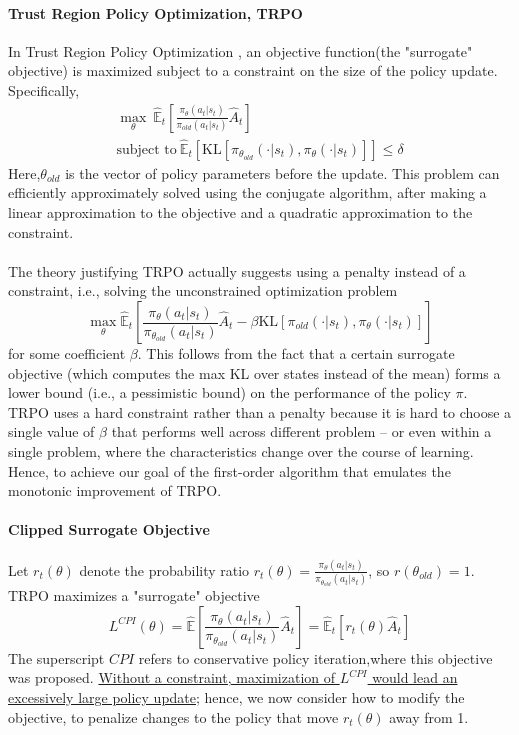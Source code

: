 \paragraph{Trust Region Policy Optimization, TRPO} In Trust Region Policy Optimization \cite{Schulman2015Trust, Wu2017Scalable}, an objective function(the "surrogate" objective) is maximized subject to a constraint on the size of the policy update. Specifically,
\begin{equation}
\begin{aligned}
\max_{\theta} \ \hat{\mathbb{E}}_{t}\left[\frac{\pi_{\theta}(a_{t}|s_{t})}{\pi_{old}(a_{t}|s_{t})}\hat{A}_{t}\right]\\
\text{subject to} \ \hat{\mathbb{E}}_{t}[\text{KL}[\pi_{\theta_{old}}(\cdot|s_{t}), \pi_{\theta}(\cdot|s_{t})]] \leq \delta
\end{aligned}
\end{equation}
Here,$\theta_{old}$ is the vector of policy parameters before the update. This problem can efficiently approximately solved using the conjugate algorithm, after making a linear approximation to the objective and a quadratic approximation to the constraint.
\paragraph{}The theory justifying TRPO actually suggests using a penalty instead of a constraint, i.e., solving the unconstrained optimization problem
\begin{equation}
\max_{\theta}\hat{\mathbb{E}}_{t}\left[\frac{\pi_{\theta}(a_{t}|s_{t})}{\pi_{\theta_{old}}(a_{t}|s_{t})}\hat{A}_{t} - \beta \text{KL}[\pi_{old}(\cdot|s_{t}), \pi_{\theta}(\cdot|s_{t})] \right]
\end{equation}
for some coefficient $\beta$. This follows from the fact that a certain surrogate objective (which computes the max KL over states instead of the mean) forms a lower bound (i.e., a pessimistic bound) on the performance of the policy $\pi$. TRPO uses a hard constraint rather than a penalty because it is hard to choose a single value of $\beta$ that performs well across different problem -- or even within a single problem, where the characteristics change over the course of learning. Hence, to achieve our goal of the first-order algorithm that emulates the monotonic improvement of TRPO.
\paragraph{Clipped Surrogate Objective} Let $r_{t}(\theta)$ denote the probability ratio $r_{t}(\theta)=\frac{\pi_{\theta}(a_{t}|s_{t})}{\pi_{\theta_{old}}(a_{t}|s_{t})}$, so $r(\theta_{old})=1$. TRPO maximizes a "surrogate" objective 
\begin{equation}
L^{CPI}(\theta) = \hat{\mathbb{E}}\left[\frac{\pi_{\theta}(a_{t}|s_{t})}{\pi_{\theta_{old}}(a_{t}|s_{t})}\hat{A}_{t}\right] =\hat{\mathbb{E}}_{t}[r_{t}(\theta)\hat{A}_{t}]
\end{equation}
The superscript $CPI$ refers to conservative policy iteration,where this objective was proposed. \uline{Without a constraint, maximization of $L^{CPI}$ would lead an excessively large policy update;} hence, we now consider how to modify the objective, to penalize changes to the policy that move $r_{t}(\theta)$ away from 1.
